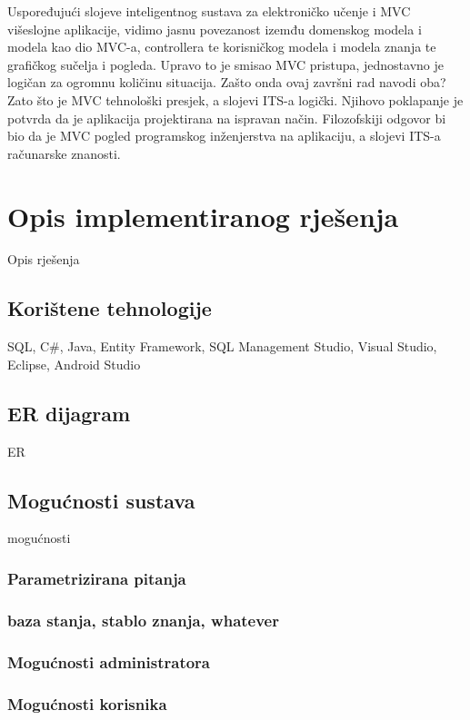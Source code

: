 \documentclass[times, utf8, zavrsni]{fer}
\begin{document}
\par
Uspoređujući slojeve inteligentnog sustava za elektroničko učenje i MVC višeslojne aplikacije, vidimo jasnu povezanost izemđu domenskog modela i modela kao dio MVC-a, controllera te korisničkog modela i modela znanja te grafičkog sučelja i pogleda. Upravo to je smisao MVC pristupa, jednostavno je logičan za ogromnu količinu situacija. Zašto onda ovaj završni rad navodi oba? Zato što je MVC tehnološki presjek, a slojevi ITS-a logički. Njihovo poklapanje je potvrda da je aplikacija projektirana na ispravan način. Filozofskiji odgovor bi bio da je MVC pogled programskog inženjerstva na aplikaciju, a slojevi ITS-a računarske znanosti.

\chapter{Opis implementiranog rješenja}
Opis rješenja

\section{Korištene tehnologije}
SQL, C\#, Java, Entity Framework,
SQL Management Studio, Visual Studio, Eclipse, Android Studio

\section{ER dijagram}
ER

\section{Mogućnosti sustava}
mogućnosti

\subsection{Parametrizirana pitanja}

\subsection{baza stanja, stablo znanja, whatever}

\subsection{Mogućnosti administratora}

\subsection{Mogućnosti korisnika}
\end{document}

